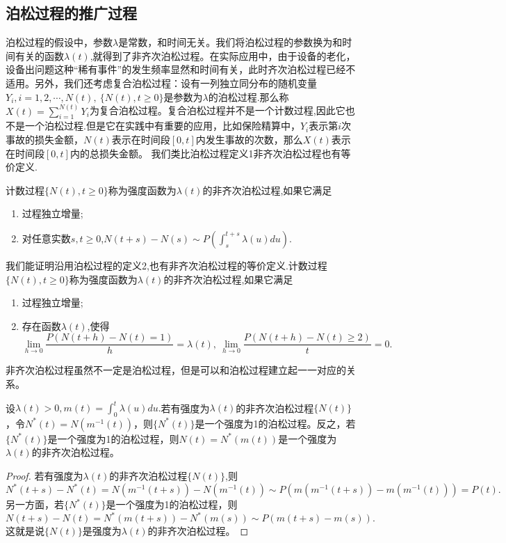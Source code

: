 \documentclass[lang=cn,10pt]{elegantbook}
\begin{document}
	\subsection{泊松过程的推广过程}
	泊松过程的假设中，参数\(\lambda\)是常数，和时间无关。我们将泊松过程的参数换为和时间有关的函数\(\lambda(t)\),就得到了非齐次泊松过程。在实际应用中，由于设备的老化，设备出问题这种“稀有事件”的发生频率显然和时间有关，此时齐次泊松过程已经不适用。另外，我们还考虑复合泊松过程：设有一列独立同分布的随机变量\(Y_i,i=1,2,\cdots,N(t),\ \{N(t),t\ge 0\}\)是参数为\(\lambda\)的泊松过程.那么称\(X(t)=\sum_{i=1}^{N(t)}Y_i\)为复合泊松过程。复合泊松过程并不是一个计数过程,因此它也不是一个泊松过程.但是它在实践中有重要的应用，比如保险精算中，\(Y_i\)表示第\(i\)次事故的损失金额，\(N(t)\)表示在时间段\([0,t]\)内发生事故的次数，那么\(X(t)\)表示在时间段\([0,t]\)内的总损失金额。
	我们类比泊松过程定义1非齐次泊松过程也有等价定义.
	\begin{definition}[非齐次泊松过程1]
		计数过程\(\{N(t),t\ge0\}\)称为强度函数为\(\lambda(t)\)的非齐次泊松过程,如果它满足
		\begin{enumerate}
			\item 过程独立增量;
			\item 对任意实数\(s,t\ge 0\),\(N(t+s)-N(s)\sim P\left(\int_{s}^{t+s}\lambda(u)du\right)\).
		\end{enumerate}
	\end{definition}

	\begin{definition}[非齐次泊松过程2]
		我们能证明沿用泊松过程的定义2,也有非齐次泊松过程的等价定义.计数过程\(\{N(t),t\ge0\}\)称为强度函数为\(\lambda(t)\)的非齐次泊松过程,如果它满足
		\begin{enumerate}
			\item 过程独立增量;
			\item 存在函数\(\lambda(t)\),使得
			\[\lim_{h\to 0}\frac{P(N(t+h)-N(t)=1)}{h}=\lambda(t),\ \lim_{h\to 0}\frac{P(N(t+h)-N(t)\ge 2)}{t}=0.\]
		\end{enumerate}
	\end{definition}
	非齐次泊松过程虽然不一定是泊松过程，但是可以和泊松过程建立起一一对应的关系。
	\begin{theorem}
		设\(\lambda(t)>0,m(t)=\int_0^t\lambda(u)du.\)若有强度为\(\lambda(t)\)的非齐次泊松过程\(\{N(t)\}\)，令\(N^*(t)=N(m^{-1}(t))\)，则\(\{N^*(t)\}\)是一个强度为1的泊松过程。反之，若\(\{N^*(t)\}\)是一个强度为1的泊松过程，则\(N(t)=N^*(m(t))\)是一个强度为\(\lambda(t)\)的非齐次泊松过程。
	\end{theorem}
	\begin{proof}
		若有强度为\(\lambda(t)\)的非齐次泊松过程\(\{N(t)\}\),则
		\[N^*(t+s)-N^*(t)=N(m^{-1}(t+s))-N(m^{-1}(t))\sim P(m(m^{-1}(t+s))-m(m^{-1}(t)))=P(t).\]
		另一方面，若\(\{N^*(t)\}\)是一个强度为1的泊松过程，则
		\[N(t+s)-N(t)=N^*(m(t+s))-N^*(m(s))\sim P(m(t+s)-m(s)).\]
		这就是说\(\{N(t)\}\)是强度为\(\lambda(t)\)的非齐次泊松过程。
	\end{proof}
\end{document}
